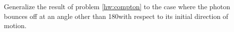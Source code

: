 Generalize the result of problem \ref{hw:compton} to the
case where the photon bounces off at an angle other than
180\degunit with respect to its initial direction of motion.
